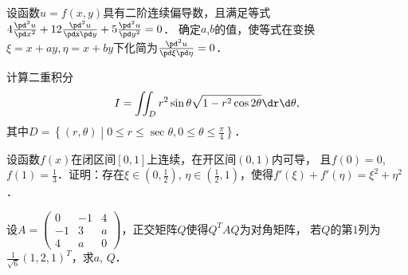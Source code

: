 \documentclass[plain,noanswer,medmath]{../../template/jnuexam}
\begin{document}
\begin{problem}[points=11]
设函数$u = f(x,y)$具有二阶连续偏导数，且满足等式
$4\frac{\pd^2 u}{\pd x^2} + 12\frac{\pd^2 u}{\pdx\pd y} + 5\frac{\pd^2 u}{\pd y^2} = 0$．
确定$a$,$b$的值，使等式在变换$\xi = x + ay,\eta = x + by$下化简为$\frac{\pd^2 u}{\pd \xi \pd \eta} = 0$．
\end{problem}


\begin{problem}[points=10]
计算二重积分
$$I = \iint_D r^2\sin \theta\sqrt{1 - r^2\cos 2\theta} \dr\d\theta,$$
其中$D=\left\{(r,\theta)\middle|0 \le r \le \sec \theta ,0 \le \theta \le \frac{\pi}{4} \right\}$．
\end{problem}


\begin{problem}[points=10]
设函数$f(x)$在闭区间$[0,1]$上连续，在开区间$(0,1)$内可导，
且$f(0) = 0$, $f(1) = \frac{1}{3}$．证明：存在$\xi \in \left(0,\frac{1}{2}\right)$,
$\eta \in \left(\frac{1}{2},1\right)$，使得$f'(\xi) + f'(\eta) = \xi^2 + \eta^2$．
\end{problem}




\begin{problem}[points=11]
设$A = \begin{pmatrix}
   0 & -1 & 4 \\
  -1 &  3 & a \\
   4 &  a & 0
\end{pmatrix}$，正交矩阵$Q$使得$Q^T AQ$为对角矩阵，
若$Q$的第$1$列为$\frac{1}{\sqrt{6}}(1,2,1)^T$，求$a$, $Q$．
\end{problem}
\end{document}
